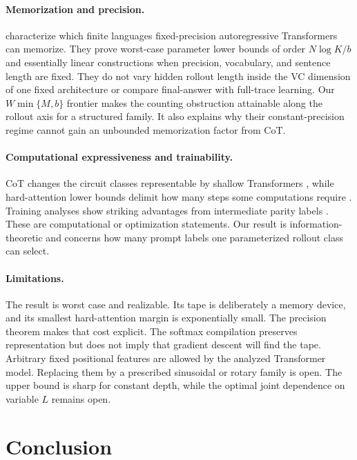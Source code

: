 \documentclass{article}
\newcommand{\1}{\mathbf 1}
\begin{document}
\paragraph{Memorization and precision.}
\citet{yu2025memorization} characterize which finite languages fixed-precision autoregressive Transformers can memorize. They prove worst-case parameter lower bounds of order $N\log K/b$ and essentially linear constructions when precision, vocabulary, and sentence length are fixed. They do not vary hidden rollout length inside the VC dimension of one fixed architecture or compare final-answer with full-trace learning. Our $W\min\{M,b\}$ frontier makes the counting obstruction attainable along the rollout axis for a structured family. It also explains why their constant-precision regime cannot gain an unbounded memorization factor from CoT.

\paragraph{Computational expressiveness and trainability.}
CoT changes the circuit classes representable by shallow Transformers \citep{merrill2023expressive,li2024serial}, while hard-attention lower bounds delimit how many steps some computations require \citep{bavandpour2025lower}. Training analyses show striking advantages from intermediate parity labels \citep{kim2025parity}. These are computational or optimization statements. Our result is information-theoretic and concerns how many prompt labels one parameterized rollout class can select.

\paragraph{Limitations.}
The result is worst case and realizable. Its tape is deliberately a memory device, and its smallest hard-attention margin is exponentially small. The precision theorem makes that cost explicit. The softmax compilation preserves representation but does not imply that gradient descent will find the tape. Arbitrary fixed positional features are allowed by the analyzed Transformer model. Replacing them by a prescribed sinusoidal or rotary family is open. The upper bound is sharp for constant depth, while the optimal joint dependence on variable $L$ remains open.

\section{Conclusion}
\end{document}
